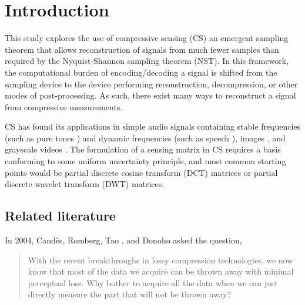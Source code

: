 \chapter{Introduction}
\label{chap:intro}

This study explores the use of compressive sensing (CS)\replaced{,}{---} an emergent sampling theorem that allows reconstruction of signals from much fewer samples than required by the Nyquist-Shannon sampling theorem (NST). In this framework, the computational burden of encoding/decoding a signal is shifted from the sampling device to the device performing reconstruction, decompression, or other modes of post-processing. As such, there exist many ways to reconstruct a signal from compressive measurements.

CS has found its applications in simple audio signals containing stable frequencies (such as pure tones \cite{Mathew2016,Andras2018}) and dynamic frequencies (such as speech \cite{Low2013,Low2018,Abrol2015}), images \cite{Mo2013,Zhou2016,Romero2016}, and grayscale videos \cite{Liu2014,Chen2014}. The formulation of a sensing matrix in CS requires a basis conforming to some uniform uncertainty principle, and most common starting points would be partial discrete cosine transform (DCT) matrices or partial discrete wavelet transform (DWT) matrices. 


\section{Related literature}
\label{sec:rrl}
In 2004, Cand\`{e}s, Romberg, Tao \cite{Candes2006}, and Donoho \cite{Donoho2006} asked the question, 

\begin{quote}
	With the recent breakthroughs in lossy compression technologies, we now know that most of the data we acquire can be thrown away with minimal perceptual loss. Why bother to acquire all the data when we can just directly measure the part that will not be thrown away?
\end{quote}

